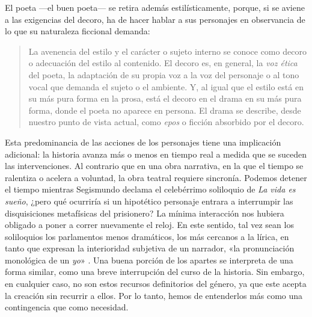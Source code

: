 El poeta —\nolinebreak el buen poeta\nolinebreak— se retira además estilísticamente, porque, si se aviene a las exigencias del decoro, ha de hacer hablar a sus personajes en observancia de lo que su naturaleza ficcional demanda: 
\blockquote{La avenencia del estilo y el carácter o sujeto interno se conoce como decoro o adecuación del estilo al contenido. El decoro es, en general, la \textit{voz ética} del poeta, la adaptación de su propia voz a la voz del personaje o al tono vocal que demanda el sujeto o el ambiente. Y, al igual que el estilo está en su más pura forma en la prosa, está el decoro en el drama en su más pura forma, donde el poeta no aparece en persona. El drama se describe, desde nuestro punto de vista actual, como  \textit{epos} o ficción absorbido por el decoro. \parencite[pp. 268-269; traducción propia]{frye1971}}

Esta predominancia de las acciones de los personajes tiene una implicación adicional: la historia avanza más o menos en tiempo real a medida que se suceden las intervenciones. Al contrario que en una obra narrativa, en la que el tiempo se ralentiza o acelera a voluntad, la obra teatral requiere sincronía. Podemos detener el tiempo mientras Segismundo declama el celebérrimo soliloquio de \textit{La vida es sueño}, ¿pero qué ocurriría si un hipotético personaje entrara a interrumpir las disquisiciones metafísicas del prisionero? La mínima interacción nos hubiera obligado a poner a correr nuevamente el reloj. En este sentido, tal vez sean los soliloquios los parlamentos menos dramáticos, los más cercanos a la lírica, en tanto que expresan la interioridad subjetiva de un narrador, «la pronunciación monológica de un \textit{yo}» \parencite[p. 191; traducción propia, énfasis añadido]{kayser1992}. Una buena porción de los apartes se interpreta de una forma similar, como una breve interrupción del curso de la historia. Sin embargo, en cualquier caso, no son estos recursos definitorios del género, ya que este acepta la creación sin recurrir a ellos. Por lo tanto, hemos de entenderlos más como una contingencia que como necesidad.

